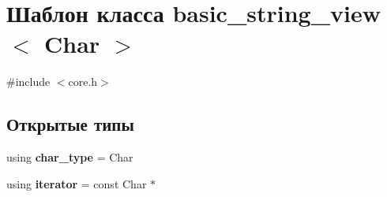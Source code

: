 \hypertarget{classbasic__string__view}{}\section{Шаблон класса basic\+\_\+string\+\_\+view$<$ Char $>$}
\label{classbasic__string__view}


{\ttfamily \#include $<$core.\+h$>$}

\subsection*{Открытые типы}
\begin{DoxyCompactItemize}
\item 
\mbox{\label{classbasic__string__view_a235c76008cbc5d34838ad60fcb1cbeef}} 
using {\bfseries char\+\_\+type} = Char
\item 
\mbox{\label{classbasic__string__view_a189f7ce44196f7d075873653a06f4464}} 
using {\bfseries iterator} = const Char $\ast$
\end{DoxyCompactItemize}
